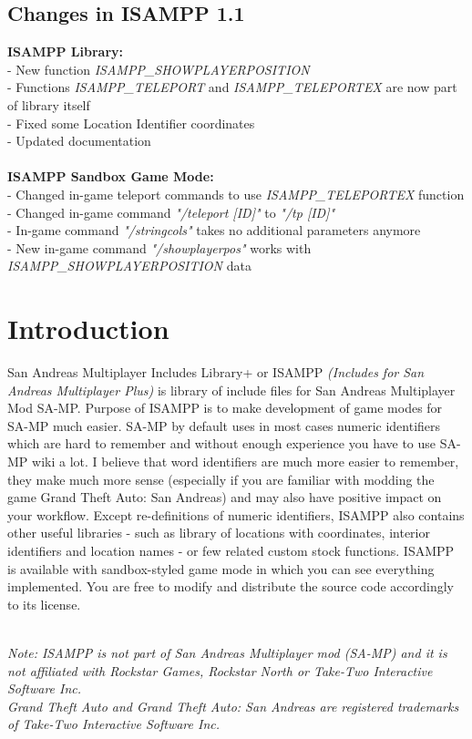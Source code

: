 \documentclass{article}
\begin{document}
\subsection{Changes in ISAMPP 1.1}
\textbf{ISAMPP Library:}
\\- New function \textit{ISAMPP\_SHOWPLAYERPOSITION}
\\- Functions \textit{ISAMPP\_TELEPORT} and \textit{ISAMPP\_TELEPORTEX} are now part of library itself
\\- Fixed some Location Identifier coordinates 
\\- Updated documentation
\\
\\
\textbf{ISAMPP Sandbox Game Mode:}
\\- Changed in-game teleport commands to use \textit{ISAMPP\_TELEPORTEX} function
\\- Changed in-game command \textit{"/teleport [ID]"} to \textit{"/tp [ID]"}
\\- In-game command \textit{"/stringcols"} takes no additional parameters anymore
\\- New in-game command \textit{"/showplayerpos"} works with \textit{ISAMPP\_SHOWPLAYERPOSITION} data


\newpage
\section{Introduction}
San Andreas Multiplayer Includes Library+ or ISAMPP \textit{(Includes for San Andreas Multiplayer Plus)} is library of include files for San Andreas Multiplayer Mod SA-MP. Purpose of ISAMPP is to make development of game modes for SA-MP much easier. SA-MP by default uses in most cases numeric identifiers which are hard to remember and without enough experience you have to use SA-MP wiki a lot. I believe that word identifiers are much more easier to remember, they make much more sense (especially if you are familiar with modding the game Grand Theft Auto: San Andreas) and may also have positive impact on your workflow. Except re-definitions of numeric identifiers, ISAMPP also contains other useful libraries - such as library of locations with coordinates, interior identifiers and location names - or few related custom stock functions. ISAMPP is available with sandbox-styled game mode in which you can see everything implemented. You are free to modify and distribute the source code accordingly to its license.

\textit{\\Note: ISAMPP is not part of San Andreas Multiplayer mod (SA-MP) and it is not affiliated with Rockstar Games, Rockstar North or Take-Two Interactive Software Inc.}
\textit{\\Grand Theft Auto and Grand Theft Auto: San Andreas are registered trademarks of Take-Two Interactive Software Inc.}
\end{document}
